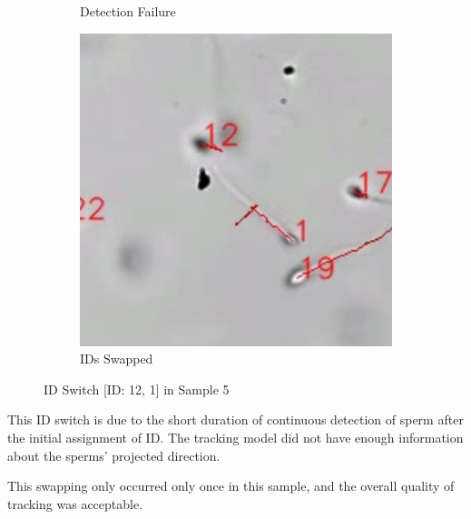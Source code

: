 \begin{figure}[h]
\begin{subfigure}[b]{0.3\textwidth}
         \caption{Detection Failure}
     \end{subfigure}
     \hfill
     \begin{subfigure}[b]{0.3\textwidth}
         \centering
         \includegraphics[width=\textwidth]{Images/sam5-3.png}
         \caption{IDs Swapped}
     \end{subfigure}
        \caption{ID Switch [ID: 12, 1] in Sample 5}
        \label{sam5switch}
\end{figure}

This ID switch is due to the short duration of continuous detection of sperm after the initial assignment of ID. The tracking model did not have enough information about the sperms' projected direction. 

This swapping only occurred only once in this sample, and the overall quality of tracking was acceptable. 